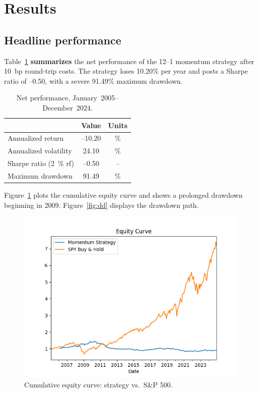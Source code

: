 \documentclass[11pt]{article}
\begin{document}
\section{Results} \label{sec:results}
\subsection{Headline performance}
Table~\ref{tab:perf} \textbf{summarizes} the net performance of the 12--1 momentum strategy after 10~bp round-trip costs.  
The strategy loses 10.20\% per year and posts a Sharpe ratio of --0.50, with a severe 91.49\% maximum drawdown.

\begin{table}[h!]
  \centering
  \begin{tabular}{lcc}
    \toprule
    & \textbf{Value} & \textbf{Units} \\ \midrule
    Annualized return      & --10.20 & \% \\[2pt]
    Annualized volatility  & 24.10   & \% \\[2pt]
    Sharpe ratio (2~\% rf) & --0.50  & -- \\[2pt]
    Maximum drawdown       & 91.49   & \% \\ \bottomrule
  \end{tabular}
  \caption{Net performance, January~2005--December~2024.}
  \label{tab:perf}
\end{table}

Figure~\ref{fig:eqcurve} plots the cumulative equity curve and shows a prolonged drawdown beginning in 2009.  
Figure~\ref{fig:dd} displays the drawdown path.

\begin{figure}[h!]
  \centering
  \includegraphics[width=0.85\linewidth]{figures/equity_curve.png}
  \caption{Cumulative equity curve: strategy vs.\ S\&P 500.}
  \label{fig:eqcurve}
\end{figure}
\end{document}

